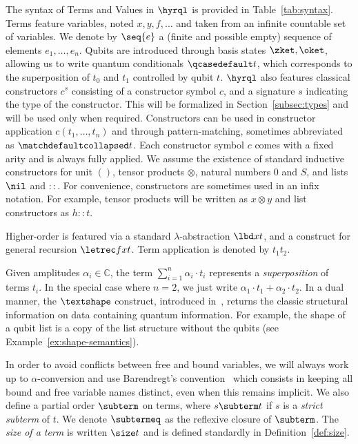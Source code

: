 The syntax of Terms and Values in $\hyrql$ is provided in
Table~\ref{tab:syntax}. Terms feature variables, noted $x, y, f, \dots$ and
taken from an infinite countable set of variables. We denote by $\seq{e}$ a
(finite and possible empty) sequence of elements $e_1, \dots, e_n$. Qubits are
introduced through basis states $\zket, \oket$, allowing us to write quantum
conditionals $\qcasedefault t$, which corresponds to the superposition of $t_0$
and $t_1$ controlled by qubit $t$. $\hyrql$ also features classical constructors
$c^s$ consisting of a constructor symbol $c$, and a signature $s$ indicating
the type of the constructor. This will be formalized in
Section~\ref{subsec:types} and will be used only when required.
Constructors can be used in constructor application $c(t_1, \dots, t_n)$
and through pattern-matching, sometimes abbreviated as $\matchdefaultcollapsed
t$. Each constructor symbol $c$ comes with a fixed arity and is always fully
applied. We assume the existence of standard inductive constructors for unit
$()$, tensor products $\otimes$, natural numbers $0$ and $S$, and lists $\nil$
and $::$. For convenience, constructors are sometimes used in an infix
notation. For example, tensor products will be written as $x \otimes y$ and
list constructors as $h::t$.

Higher-order is featured via a standard $\lambda$-abstraction $\lbd x t$, and a
construct for general recursion $\letrec f x t$. Term application is denoted by
$t_1t_2$.

Given amplitudes $\alpha_i \in \mathbb C$, the term $\sum_{i=1}^n \alpha_i
\cdot t_i$ represents a \emph{superposition} of terms $t_i$. In the special
case where $n=2$, we just write $\alpha_1 \cdot t_1+\alpha_2 \cdot t_2$. In a
dual manner, the $\textshape$ construct, introduced in~\cite{GLRSV13},
returns the classic structural information on data containing quantum
information. For example, the shape of a qubit list is a copy of the list
structure without the qubits (see Example~\ref{ex:shape-semantics}).


In order to avoid conflicts
between free and bound variables, we will always work up to $\alpha$-conversion
and use Barendregt's convention~\cite[p. 26]{Bar84} which consists in keeping
all bound and free variable names distinct, even when this remains implicit.
We also define a partial order $\subterm$ on terms, where $s \subterm t$ if $s$
is a \emph{strict subterm} of $t$. We denote $\subtermeq$ as the reflexive
closure of $\subterm$. The \emph{size of a term} is written $\size t$ and is
defined standardly in Definition~\ref{def:size}.

